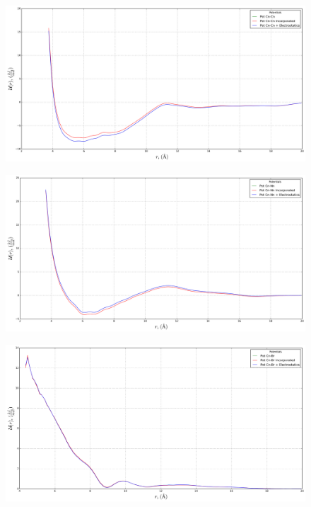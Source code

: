 \documentclass[10pt,a4paper,twoside]{article}
\begin{document}
\begin{figure}[H]
  \begin{center}
	\includegraphics[width=0.8 \textwidth]{./graphs/PtsChargedSys4}
  \end{center}
\end{figure}

\begin{figure}[H]
  \begin{center}
	\includegraphics[width=0.8 \textwidth]{./graphs/PtsChargedSys5}
  \end{center}
\end{figure}

\begin{figure}[H]
  \begin{center}
	\includegraphics[width=0.8 \textwidth]{./graphs/PtsChargedSys6}
  \end{center}
\end{figure}
\end{document}

